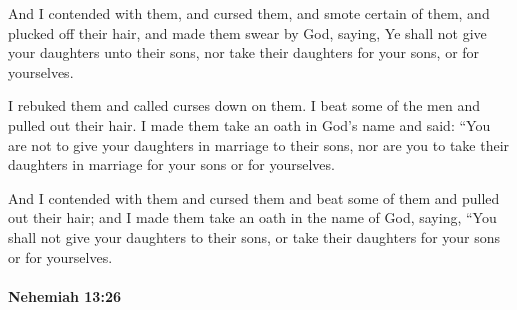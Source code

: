 			\begin{versebox}
					\item[BHS] 
					\item[LXX] 
					\item[ASV] And I contended with them, and cursed them, and smote certain of them, and plucked off their hair, and made them swear by God, saying, Ye shall not give your daughters unto their sons, nor take their daughters for your sons, or for yourselves.
					\item[NIV] I rebuked them and called curses down on them. I beat some of the men and pulled out their hair. I made them take an oath in God’s name and said: “You are not to give your daughters in marriage to their sons, nor are you to take their daughters in marriage for your sons or for yourselves.
					\item[NRSV] And I contended with them and cursed them and beat some of them and pulled out their hair; and I made them take an oath in the name of God, saying, “You shall not give your daughters to their sons, or take their daughters for your sons or for yourselves.
			\end{versebox}

		\paragraph{Nehemiah 13:26} %
			\label{NEHEMIAH-13-26}

